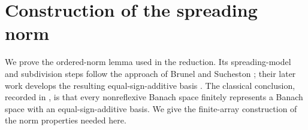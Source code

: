 \documentclass[11pt]{article}
\theoremstyle{definition}
\theoremstyle{remark}
\begin{document}
\appendix
\setcounter{equation}{0}
\renewcommand{\theequation}{\thesection.\arabic{equation}}
\section{Construction of the spreading norm}\label{app:norm}

We prove the ordered-norm lemma used in the reduction.
Its spreading-model and subdivision steps follow the approach of Brunel
and Sucheston \cite{BrunelSucheston1974,BrunelSucheston1975}; their later
work develops the resulting equal-sign-additive basis
\cite{BrunelSucheston}. The classical conclusion, recorded in
\cite[Theorem~2.2]{Ostrovskii}, is that every nonreflexive Banach space
finitely represents a Banach space with an equal-sign-additive basis.
We give the finite-array construction of the norm properties needed here.
\end{document}
